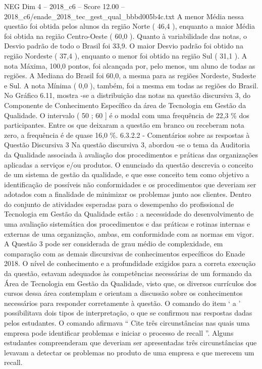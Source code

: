 \begin{textsample}{NEG Dim 4 – 2018\_c6 – Score 12.00 – 2018\_c6/enade\_2018\_tec\_gest\_qual\_bbbd005b4c.txt}
A menor Média nessa questão foi obtida pelos alunos da região Norte ( 46,4 ), enquanto a maior Média foi obtida na região Centro-Oeste ( 60,0 ).
Quanto à variabilidade das notas, o Desvio padrão de todo o Brasil foi 33,9.
O maior Desvio padrão foi obtido na região Nordeste ( 37,4 ), enquanto o menor foi obtido na região Sul ( 31,1 ).
A nota Máxima, 100,0 pontos, foi alcançada por, pelo menos, um aluno de todas as regiões.
A Mediana do Brasil foi 60,0, a mesma para as regiões Nordeste, Sudeste e Sul.
A nota Mínima ( 0,0 ), também, foi a mesma em todas as regiões do Brasil.
No Gráfico 6.11, mostra -se a distribuição das notas na questão discursiva 3, do Componente de Conhecimento Específico da área de Tecnologia em Gestão da Qualidade.
O intervalo ( 50 ; 60 ] é o modal com uma frequência de 22,3 \% dos participantes.
Entre os que deixaram a questão em branco ou receberam nota zero, a frequência é de quase 16,0 \%. 6.3.2.2 - Comentários sobre as respostas à Questão Discursiva 3 Na questão discursiva 3, abordou -se o tema da Auditoria da Qualidade associada à avaliação dos procedimentos e práticas das organizações aplicadas a serviços e/ou produtos.
O enunciado da questão descrevia o conceito de um sistema de gestão da qualidade, e que esse conceito tem como objetivo a identificação de possíveis não conformidades e os procedimentos que deveriam ser adotados com a finalidade de minimizar os problemas junto aos clientes.
Dentro do conjunto de atividades esperadas para o desempenho do profissional de Tecnologia em Gestão da Qualidade estão : a necessidade do desenvolvimento de uma avaliação sistemática dos procedimentos e das práticas e rotinas internas e externas de uma organização, ambas, em conformidade com as normas em vigor.
A Questão 3 pode ser considerada de grau médio de complexidade, em comparação com as demais discursivas de conhecimentos específicos do Enade 2018.
O nível de conhecimento e a profundidade exigidos para a correta execução da questão, estavam adequados às competências necessárias de um formando da Área de Tecnologia em Gestão da Qualidade, visto que, os diversos currículos dos cursos dessa área contemplam e orientam a discussão sobre os conhecimentos necessários para responder corretamente à questão.
O comando do item ‘ a ’ possibilitava dois tipos de interpretação, o que se confirmou nas respostas dadas pelos estudantes.
O comando afirmava “ Cite três circunstâncias nas quais uma empresa pode identificar problemas e iniciar o processo de recall ”.
Alguns estudantes compreenderam que deveriam ser apresentadas três circunstâncias que levavam a detectar os problemas no produto de uma empresa e que merecem um recall.

\end{textsample}
